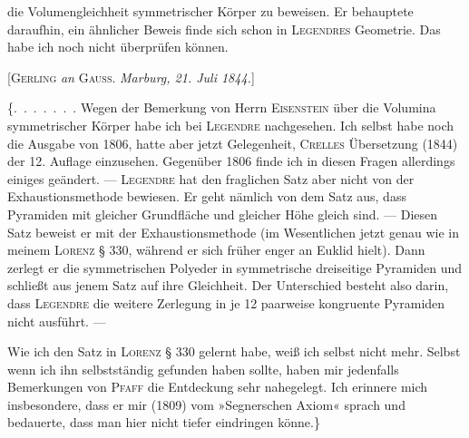 %
\noindent die Volumengleichheit symmetrischer Körper zu beweisen. Er behauptete daraufhin, ein ähnlicher Beweis finde sich schon in \textsc{Legendres} Geometrie. Das habe ich noch nicht überprüfen können.

\begin{center}
[\textsc{Gerling} \emph{an} \textsc{Gauss}. \emph{Marburg, 21. Juli 1844.}]
\end{center}

\{\mbox{.\ .\ .\ .\ .\ .\ .} Wegen der Bemerkung von Herrn \textsc{Eisenstein} über die Volumina symmetrischer Körper habe ich bei \textsc{Legendre} nachgesehen. Ich selbst habe noch die Ausgabe von 1806, hatte aber jetzt Gelegenheit, \textsc{Crelles} Übersetzung (1844) der 12. Auflage einzusehen. Gegenüber 1806 finde ich in diesen Fragen allerdings einiges geändert. --- \textsc{Legendre} hat den fraglichen Satz aber nicht  von der Exhaustionsmethode bewiesen. Er geht nämlich von dem Satz aus, dass Pyramiden mit gleicher Grundfläche und gleicher Höhe gleich sind. --- Diesen Satz beweist er mit der Exhaustionsmethode (im Wesentlichen jetzt genau wie in meinem \textsc{Lorenz} § 330, während er sich früher enger an Euklid hielt). Dann zerlegt er die symmetrischen Polyeder in symmetrische dreiseitige Pyramiden und schließt aus jenem Satz auf ihre Gleichheit. Der Unterschied besteht also darin, dass \textsc{Legendre} die weitere Zerlegung in je 12 paarweise kongruente Pyramiden nicht ausführt. ---

Wie ich den Satz in \textsc{Lorenz} § 330 gelernt habe, weiß ich selbst nicht mehr. Selbst wenn ich ihn selbstständig gefunden haben sollte, haben mir jedenfalls Bemerkungen von \textsc{Pfaff} die Entdeckung sehr nahegelegt. Ich erinnere mich insbesondere, dass er mir (1809) vom »Segnerschen Axiom« sprach und bedauerte, dass man hier nicht tiefer eindringen könne.\}
